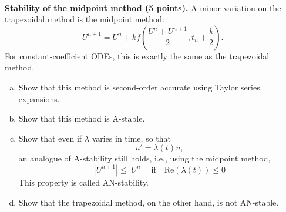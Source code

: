 \documentclass{article}
\begin{document}
\begin{problem} \\ 
    \textbf{Stability of the midpoint method (5 points).} A minor variation on the trapezoidal method is the midpoint method: 
    \[
        U^{n+1} = U^n + k f\left( \frac{U^n + U^{n+1}}{2}, t_n + \frac{k}{2} \right).
    \]
    For constant-coefficient ODEs, this is exactly the same as the trapezoidal method.
    \begin{enumerate}[(a)]
        \item Show that this method is second-order accurate using Taylor series expansions.
        \item Show that this method is A-stable.
        \item Show that even if $\lambda$ varies in time, so that 
        \[
            u' = \lambda(t) u,
        \]
        an analogue of A-stability still holds, i.e., using the midpoint method,
        \[
            |U^{n+1}| \leq |U^n| \quad \text{if} \quad \text{Re}(\lambda(t)) \leq 0 %
        \]
        This property is called AN-stability.
        \item Show that the trapezoidal method, on the other hand, is not AN-stable.
    \end{enumerate}
\end{problem}
\end{document}
